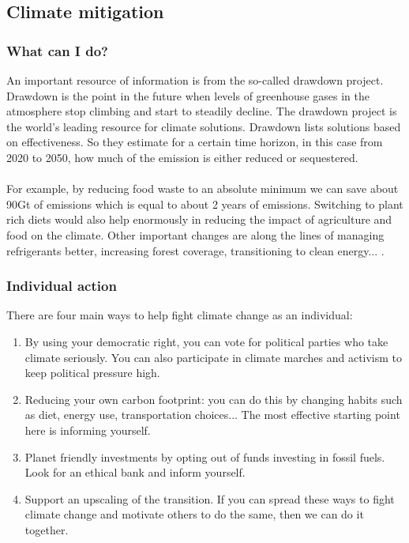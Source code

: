 \documentclass[../summary.tex]{subfiles}
\begin{document}
		\subsection{Climate mitigation}
			\subsubsection{What can I do?}
				An important resource of information is from the so-called drawdown project. Drawdown is the point in the future when levels of greenhouse gases in the atmosphere stop climbing and start to steadily decline. The drawdown project is the world's leading resource for climate solutions. Drawdown lists solutions based on effectiveness. So they estimate for a certain time horizon, in this case from 2020 to 2050, how much of the emission is either reduced or sequestered. 
				\\\\
				For example, by reducing food waste to an absolute minimum we can save about 90Gt of emissions which is equal to about 2 years of emissions. Switching to plant rich diets would also help enormously in reducing the impact of agriculture and food on the climate. Other important changes are along the lines of managing refrigerants better, increasing forest coverage, transitioning to clean energy... .
				
			\subsubsection{Individual action} 
				There are four main ways to help fight climate change as an individual:
				\begin{enumerate}
					\item By using your democratic right, you can vote for political parties who take climate seriously. You can also participate in climate marches and activism to keep political pressure high. 
					\item Reducing your own carbon footprint: you can do this by changing habits such as diet, energy use, transportation choices... The most effective starting point here is informing yourself.
					\item Planet friendly investments by opting out of funds investing in fossil fuels. Look for an ethical bank and inform yourself.
					\item Support an upscaling of the transition. If you can spread these ways to fight climate change and motivate others to do the same, then we can do it together.
				\end{enumerate}
				
\end{document}
